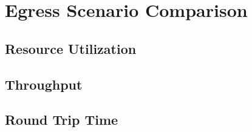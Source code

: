 \chapter{Egress Scenario Comparison}
\label{cha:compare_egress}


\section{Resource Utilization}
\label{sec:resources}



\section{Throughput}
\label{sec:throughput}




\section{Round Trip Time}
\label{sec:rtt}




